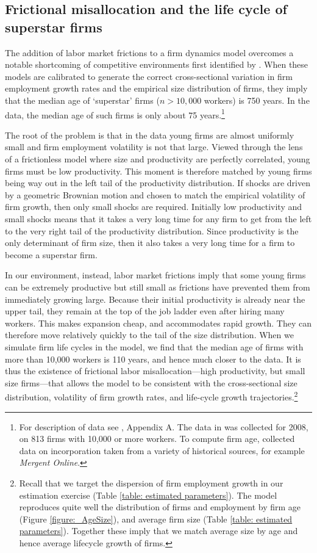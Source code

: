\subsection{Frictional misallocation and the life cycle of superstar firms}
The addition of labor market frictions to a firm dynamics model overcomes a notable shortcoming of competitive environments first identified by \citet{luttmer2011}.
When these models are calibrated to generate the correct cross-sectional variation in firm employment growth rates and the empirical size distribution of firms, they imply that the median age of `superstar' firms ($n>10,000$ workers) is 750 years.
In the data, the median age of such firms is only about 75 years.\footnote{For description of data see \cite{luttmer2011}, Appendix A.
    The data in \cite{luttmer2011} was collected for 2008, on 813 firms with 10,000 or more workers.
    To compute firm age, \cite{luttmer2011} collected data on incorporation taken from a variety of historical sources, for example \textit{Mergent Online}.
}

The root of the problem is that in the data young firms are almost uniformly small and firm employment volatility is not that large.
Viewed through the lens of a frictionless model where size and productivity are perfectly correlated, young firms must be low productivity.
This moment is therefore matched by young firms being way out in the left tail of the productivity distribution.
If shocks are driven by a geometric Brownian motion and chosen to match the empirical volatility of firm growth, then only small shocks are required.
Initially low productivity and small shocks means that it takes a very long time for any firm to get from the left to the very right tail of the productivity distribution.
Since productivity is the only determinant of firm size, then it also takes a very long time for a firm to become a superstar firm.

In our environment, instead, labor market frictions imply that some young firms can be extremely productive but still small as frictions have prevented them from immediately growing large.
Because their initial productivity is already near the upper tail, they remain at the top of the job ladder even after hiring many workers.
This makes expansion cheap, and accommodates rapid growth.
They can therefore move relatively quickly to the tail of the size distribution.
When we simulate firm life cycles in the model, we find that the median age of firms with more than 10,000 workers is 110 years, and hence much closer to the data.
It is thus the existence of frictional labor misallocation---high productivity, but small size firms---that allows the model to be consistent with the cross-sectional size distribution, volatility of firm growth rates, and life-cycle growth trajectories.\footnote{
    Recall that we target the dispersion of firm employment growth in our estimation exercise (Table \ref{table: estimated parameters}).
    The model reproduces quite well the distribution of firms and employment by firm age (Figure \ref{figure:_AgeSize}), and average firm size (Table \ref{table: estimated parameters}).
    Together these imply that we match average size by age and hence average lifecycle growth of firms.
}

